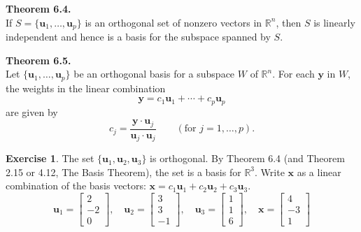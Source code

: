 \documentclass[10pt]{book}
\newcommand{\boxcolor}{gray!30}
\newenvironment{boxthm}{\begin{mdframed}[backgroundcolor=\boxcolor,nobreak=true]}{\end{mdframed}}
\theoremstyle{definition}
\newtheorem{exercise}{Exercise}[section]
\newcommand{\R}{\mathbb{R}}
\newcommand{\vect}[1]{\ensuremath{\boldsymbol{\mathbf{#1}}}}
\newcommand{\vectset}[3][v]{\{\vect{#1}_{#2},\ldots,\vect{#1}_{#3}\}}
\begin{document}
\begin{boxthm}
	\textbf{Theorem 6.4.} \\
	If $S=\vectset[u]{1}{p}$ is an orthogonal set of nonzero vectors in $\R^n$, then $S$ is linearly independent and hence is a basis for the subspace spanned by $S$.
\end{boxthm}
\vspace{-1em}
\begin{boxthm}
	\textbf{Theorem 6.5.} \\
	Let $\vectset[u]{1}{p}$ be an orthogonal basis for a subspace $W$ of $\R^n$. For each $\vect{y}$ in $W$, the weights in the linear combination
	\vspace{-1ex}
	$$ \vect{y} = c_1\vect{u}_1+\cdots+c_p\vect{u}_p $$
	are given by 
	\vspace{-1ex}
	$$ c_j = \frac{\vect{y}\cdot\vect{u}_j}{\vect{u}_j\cdot\vect{u}_j} \qquad
	(\text{for } j=1,\ldots,p). $$
\end{boxthm}


\begin{exercise} %
	The set $\{\vect{u}_1,\vect{u}_2,\vect{u}_3\}$ is orthogonal. By Theorem 6.4 (and Theorem 2.15 or 4.12, The Basis Theorem), the set is a basis for $\R^3$. Write $\vect{x}$ as a linear combination of the basis vectors: $\vect{x} = c_1\vect{u}_1 + c_2\vect{u}_2 + c_3\vect{u}_3$.
	$$ \vect{u}_1 = \begin{bmatrix}2\\-2\\0\end{bmatrix}, \quad
	\vect{u}_2 = \begin{bmatrix}3\\3\\-1\end{bmatrix}, \quad
	\vect{u}_3 = \begin{bmatrix}1\\1\\6\end{bmatrix}, \quad
	\vect{x} = \begin{bmatrix}4\\-3\\1\end{bmatrix} $$
\end{exercise}
\vfill


\newpage
\end{document}
